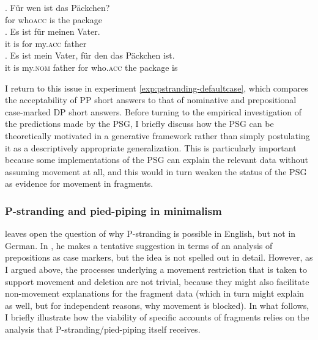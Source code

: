 \exg. Für wen ist das Päckchen?\label{ex:package-cleft}\\ 
      for who\textsc{acc} is the package\\
      \ag. Es ist für meinen Vater.\\
      it is for my.\textsc{acc} father\\
      \bg. Es ist mein Vater, für den das Päckchen ist.\\ 
      it is my.\textsc{nom} father for who.\textsc{acc} the package is\\
      
I return to this issue in experiment \ref{exp:pstranding-defaultcase}, which compares the acceptability of PP short answers to that of nominative and prepositional case-marked DP short answers. Before turning to the empirical investigation of the predictions made by the PSG, I briefly discuss how the PSG can be theoretically motivated in a generative framework rather than simply postulating it as a descriptively appropriate generalization. This is particularly important because some implementations of the PSG can explain the relevant data without assuming movement at all, and this would in turn weaken the status of the PSG as evidence for movement in fragments.


\subsubsection{P-stranding and pied-piping in minimalism}
\label{sec:pstranding-background-mp}
\citet{merchant2004} leaves open the question of why P-stranding is possible in English, but not in German. In \citet{merchant2001}, he makes a tentative suggestion in terms of an analysis of prepositions as case markers, but the idea is not spelled out in detail. However, as I argued above, the processes underlying a movement restriction that is taken to support movement and deletion are not trivial, because they might also facilitate non-movement explanations for the fragment data (which in turn might explain as well, but for independent reasons, why movement is blocked). In what follows, I briefly illustrate how the viability of specific accounts of fragments relies on the analysis that P-stranding/pied-piping itself receives.

